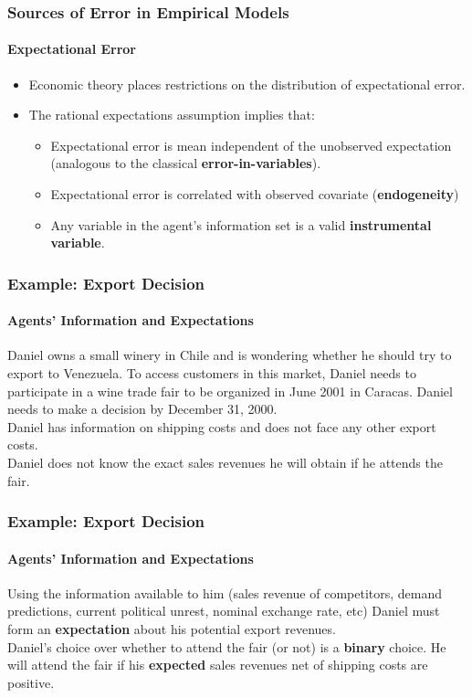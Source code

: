 \documentclass[notes=show]{beamer}
\begin{document}
\begin{frame}
\frametitle{Sources of Error in Empirical Models}
\framesubtitle{Expectational Error}

\begin{itemize}
	\item Economic theory places restrictions on the distribution of expectational error. 
	\item The rational expectations assumption implies that:
	\begin{itemize}
	 	\item Expectational error is mean independent of the unobserved expectation (analogous to the classical \textbf{error-in-variables}).
		\item Expectational error is correlated with observed covariate (\textbf{endogeneity})
		\item Any variable in the agent's information set is a valid \textbf{instrumental variable}.
	\end{itemize}	
\end{itemize}
\end{frame}

\begin{frame}
\frametitle{Example: Export Decision}
\framesubtitle{Agents' Information and Expectations}

Daniel owns a small winery in Chile and is wondering whether he should try to export to Venezuela. To access customers in this market, Daniel needs to participate in a wine trade fair to be organized in June 2001 in Caracas. Daniel needs to make a decision by December 31, 2000.\\
\bigskip
Daniel has information on shipping costs and does not face any other export costs.\\
\bigskip
Daniel does not know the exact sales revenues he will obtain if he attends the fair.  
\end{frame}

\begin{frame}
\frametitle{Example: Export Decision}
\framesubtitle{Agents' Information and Expectations}

Using the information available to him (sales revenue of competitors, demand predictions, current political unrest, nominal exchange rate, etc) Daniel must form an \textbf{expectation} about his potential export revenues.\\
\bigskip
Daniel's choice over whether to attend the fair (or not) is a \textbf{binary} choice. He will attend the fair if his \textbf{expected} sales revenues net of shipping costs are positive.
\end{frame}
\end{document}
